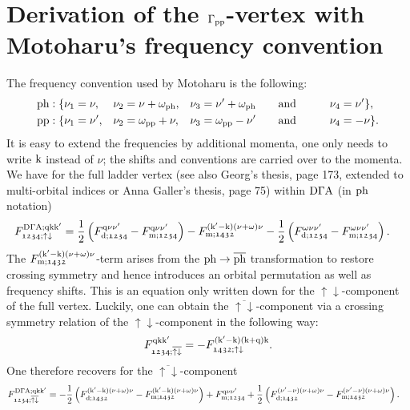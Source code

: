 \documentclass[main.tex]{subfiles}
\begin{document}
\section{Derivation of the $\Gamma_{\text{pp}}$-vertex with Motoharu's frequency convention}

The frequency convention used by Motoharu is the following:
\begin{subequations}
\begin{align}
	&\text{ph}: \{\nu_1=\nu,&&\nu_2=\nu+\omega_{\text{ph}},&&\nu_3=\nu'+\omega_{\text{ph}}\qquad\text{and}\qquad&&\nu_4=\nu' \}, \\
	&\text{pp}: \{\nu_1=\nu',&&\nu_2=\omega_{\text{pp}}+\nu,&&\nu_3=\omega_{\text{pp}}-\nu'\qquad\text{and}\qquad&&\nu_4=-\nu \}.
\end{align}
\end{subequations}
It is easy to extend the frequencies by additional momenta, one only needs to write $\text{k}$ instead of $\nu$; the shifts and conventions are carried over to the momenta. We have for the full ladder vertex (see also Georg's thesis, page 173, extended to multi-orbital indices or Anna Galler's thesis, page 75) within $\text{D}\Gamma\text{A}$ (in $\text{ph}$ notation)
\begin{align}
	F^{\text{D}\Gamma\text{A};\text{q}\text{k}\text{k}'}_{\mathfrak{1234};\uparrow\downarrow}&=\frac12\left (F_{\text{d};\mathfrak{1234}}^{\text{q}\nu\nu'}-F_{\text{m};\mathfrak{1234}}^{\text{q}\nu\nu'}\right )-F_{\text{m};\mathfrak{1432}}^{(\text{k}'-\text{k})(\nu+\omega)\nu}-\frac12\left (F_{\text{d};\mathfrak{1234}}^{\omega\nu\nu'}-F_{\text{m};\mathfrak{1234}}^{\omega\nu\nu'}\right ).
\end{align}
The $F_{\text{m};\mathfrak{1432}}^{(\text{k}'-\text{k})(\nu+\omega)\nu}$-term arises from the $\text{ph}\to\overline{\text{ph}}$ transformation to restore crossing symmetry and hence introduces an orbital permutation as well as frequency shifts. This is an equation only written down for the $\uparrow\downarrow$-component of the full vertex. Luckily, one can obtain the $\overline{\uparrow\downarrow}$-component via a crossing symmetry relation of the $\uparrow\downarrow$-component in the following way:
\begin{align}
	F^{\text{q}\text{k}\text{k}'}_{\mathfrak{1234};\overline{\uparrow\downarrow}}=-F^{(\text{k}'-\text{k})(\text{k}+\text{q})\text{k}}_{\mathfrak{1432};\uparrow\downarrow}.
\end{align}
One therefore recovers for the $\overline{\uparrow\downarrow}$-component
\begin{align}
	F^{\text{D}\Gamma\text{A};\text{q}\text{k}\text{k}'}_{\mathfrak{1234};\overline{\uparrow\downarrow}}&=-\frac12\left (F_{\text{d};\mathfrak{1432}}^{(\text{k}'-\text{k})(\nu+\omega)\nu}-F_{\text{m};\mathfrak{1432}}^{(\text{k}'-\text{k})(\nu+\omega)\nu}\right )+F_{\text{m};\mathfrak{1234}}^{\text{q}\nu\nu'}+\frac12\left (F_{\text{d};\mathfrak{1432}}^{(\nu'-\nu)(\nu+\omega)\nu}-F_{\text{m};\mathfrak{1432}}^{(\nu'-\nu)(\nu+\omega)\nu}\right ).
\end{align}
\end{document}
